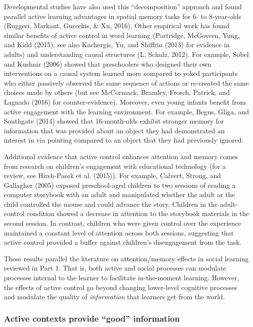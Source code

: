 \documentclass[english,floatsintext,man]{apa6}
\theoremstyle{definition}
\theoremstyle{definition}
\theoremstyle{definition}
\theoremstyle{remark}
\begin{document}
Developmental studies have also used this \enquote{decomposition}
approach and found parallel active learning advantages in spatial memory
tasks for 6- to 8-year-olds (Ruggeri, Markant, Gureckis, \& Xu, 2016).
Other empirical work has found similar benefits of active control in
word learning (Partridge, McGovern, Yung, and Kidd (2015); see also
Kachergis, Yu, and Shiffrin (2013) for evidence in adults) and
understanding causal structures (L. Schulz, 2012). For example, Sobel
and Kushnir (2006) showed that preschoolers who designed their own
interventions on a causal system learned more compared to yoked
participants who either passively observed the same sequence of actions
or re-created the same choices made by others (but see McCormack,
Bramley, Frosch, Patrick, and Lagnado (2016) for counter-evidence).
Moreover, even young infants benefit from active engagement with the
learning environment. For example, Begus, Gliga, and Southgate (2014)
showed that 16-month-olds exhibit stronger memory for information that
was provided about an object they had demonstrated an interest in via
pointing compared to an object that they had previously ignored.

Additional evidence that active control enhances attention and memory
comes from research on children's engagement with educational technology
(for a review, see Hirsh-Pasek et al. (2015)). For example, Calvert,
Strong, and Gallagher (2005) exposed preschool-aged children to two
sessions of reading a computer storybook with an adult and manipulated
whether the adult or the child controlled the mouse and could advance
the story. Children in the adult-control condition showed a decrease in
attention to the storybook materials in the second session. In contrast,
children who were given control over the experience maintained a
constant level of attention across both sessions, suggesting that active
control provided a buffer against children's disengagement from the
task.

These results parallel the literature on attention/memory effects in
social learning reviewed in Part 1. That is, both active and social
processes can modulate processes internal to the learner to facilitate
in-the-moment learning. However, the effects of active control go beyond
changing lower-level cognitive processes and modulate the quality of
\emph{information} that learners get from the world.

\subsubsection{\texorpdfstring{Active contexts provide \enquote{good}
information}{Active contexts provide good information}}\label{active-contexts-provide-good-information}
\end{document}
